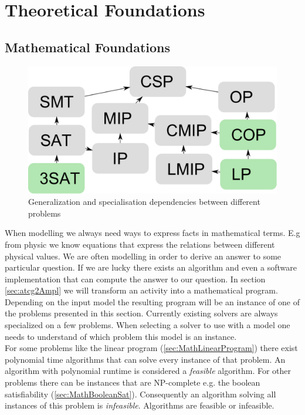 \chapter{Theoretical Foundations}
\label{chap:preliminaries}
\section{Mathematical Foundations}
\label{sec:Maths}
\begin{figure}
\label{fig:problemLatice}
\includegraphics[width=\textwidth]{./pics/ProblemLatice.pdf}
\caption{Generalization and specialisation dependencies between different problems}
\end{figure}
When modelling we always need ways to express facts in mathematical terms. E.g from physic we know equations that express the relations between different physical values. We are often modelling in order to derive an answer to some particular question. If we are lucky there exists an algorithm and even a software implementation that can compute the answer to our question. In section \ref{sec:atcg2Ampl} we will transform an activity into a mathematical program. Depending on the input model the resulting program will be an instance of one of the problems presented in this section. Currently existing solvers are always specialized on a few problems. When selecting a solver to use with a model one needs to understand of which problem this model is an instance.\\
For some problems like the linear program (\ref{sec:MathLinearProgram}) there exist polynomial time algorithms that can solve every instance of that problem. An algorithm with polynomial runtime is considered a \emph{feasible} algorithm.  For other problems there can be instances that are NP-complete e.g. the boolean satisfiability (\ref{sec:MathBooleanSat}). Consequently an algorithm solving all instances of this problem is \emph{infeasible}. Algorithms are feasible or infeasible. \\
